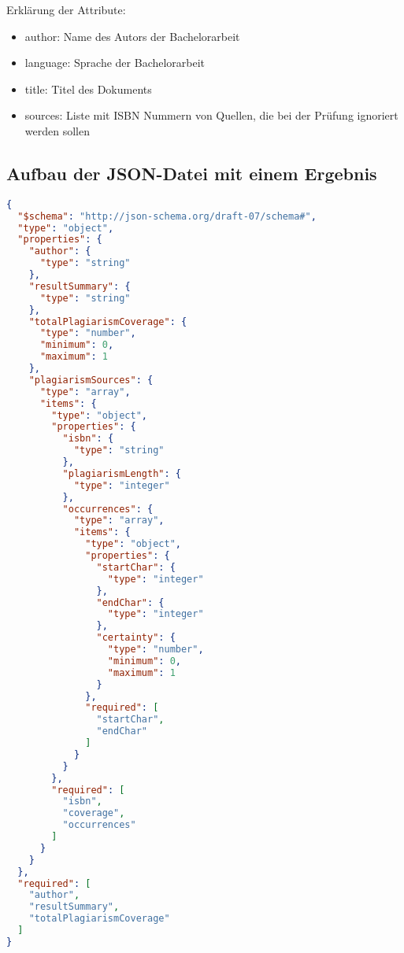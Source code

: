 Erklärung der Attribute:
\begin{itemize}
    \item author: Name des Autors der Bachelorarbeit
    \item language: Sprache der Bachelorarbeit
    \item title: Titel des Dokuments
    \item sources: Liste mit ISBN Nummern von Quellen, die bei der Prüfung ignoriert werden sollen
\end{itemize}

\subsection{Aufbau der JSON-Datei mit einem Ergebnis}\label{subsec:json-ergebnis}
\begin{lstlisting}[caption={JSON-Datei mit einem Ergebnis},captionpos=b,label={lst:json-ergebnis}, language=json]
{
  "$schema": "http://json-schema.org/draft-07/schema#",
  "type": "object",
  "properties": {
    "author": {
      "type": "string"
    },
    "resultSummary": {
      "type": "string"
    },
    "totalPlagiarismCoverage": {
      "type": "number",
      "minimum": 0,
      "maximum": 1
    },
    "plagiarismSources": {
      "type": "array",
      "items": {
        "type": "object",
        "properties": {
          "isbn": {
            "type": "string"
          },
          "plagiarismLength": {
            "type": "integer"
          },
          "occurrences": {
            "type": "array",
            "items": {
              "type": "object",
              "properties": {
                "startChar": {
                  "type": "integer"
                },
                "endChar": {
                  "type": "integer"
                },
                "certainty": {
                  "type": "number",
                  "minimum": 0,
                  "maximum": 1
                }
              },
              "required": [
                "startChar",
                "endChar"
              ]
            }
          }
        },
        "required": [
          "isbn",
          "coverage",
          "occurrences"
        ]
      }
    }
  },
  "required": [
    "author",
    "resultSummary",
    "totalPlagiarismCoverage"
  ]
}
\end{lstlisting}

